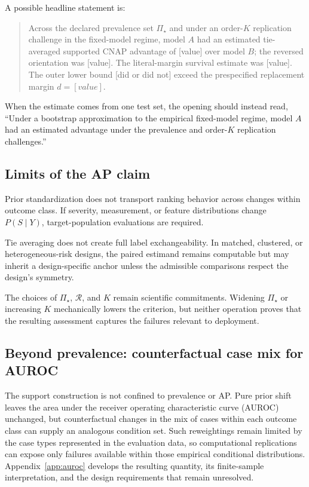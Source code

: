 \documentclass[11pt]{article}
\newcommand{\Regime}{\mathcal{R}}
\newcommand{\PSet}{\Pi_\star}
\theoremstyle{remark}
\begin{document}
A possible headline statement is:
\begin{quote}
Across the declared prevalence set $\PSet$ and under an order-$K$ replication challenge in the fixed-model regime, model $A$ had an estimated tie-averaged supported CNAP advantage of [value] over model $B$; the reversed orientation was [value]. The literal-margin survival estimate was [value]. The outer lower bound [did or did not] exceed the prespecified replacement margin $d=[value].$
\end{quote}
When the estimate comes from one test set, the opening should instead read, ``Under a bootstrap approximation to the empirical fixed-model regime, model $A$ had an estimated advantage under the prevalence and order-$K$ replication challenges.''

\subsection{Limits of the AP claim}

Prior standardization does not transport ranking behavior across changes within outcome class. If severity, measurement, or feature distributions change $P(S\mid Y)$, target-population evaluations are required.

Tie averaging does not create full label exchangeability. In matched, clustered, or heterogeneous-risk designs, the paired estimand remains computable but may inherit a design-specific anchor unless the admissible comparisons respect the design's symmetry.

The choices of $\PSet$, $\Regime$, and $K$ remain scientific commitments. Widening $\PSet$ or increasing $K$ mechanically lowers the criterion, but neither operation proves that the resulting assessment captures the failures relevant to deployment.

\subsection{Beyond prevalence: counterfactual case mix for AUROC}
\label{sec:auroc-outlook}

The support construction is not confined to prevalence or AP. Pure prior shift leaves the area under the receiver operating characteristic curve (AUROC) unchanged, but counterfactual changes in the mix of cases within each outcome class can supply an analogous condition set. Such reweightings remain limited by the case types represented in the evaluation data, so computational replications can expose only failures available within those empirical conditional distributions. Appendix~\ref{app:auroc} develops the resulting quantity, its finite-sample interpretation, and the design requirements that remain unresolved.
\end{document}
